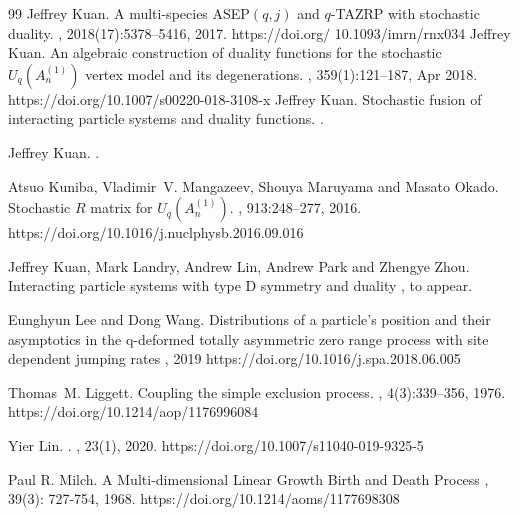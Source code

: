 \documentclass{ximera}
\begin{document}
\begin{thebibliography}{99}
Jeffrey Kuan.
\newblock A multi-species {ASEP}$(q,j)$ and $q$-{TAZRP} with stochastic
  duality.
,
  2018(17):5378--5416, 2017.
  https://doi.org/ 10.1093/imrn/rnx034
Jeffrey Kuan.
\newblock An algebraic construction of duality functions for the stochastic
  ${U}_q({A}_n^{(1)})$ vertex model and its degenerations.
, 359(1):121--187, Apr
  2018. https://doi.org/10.1007/s00220-018-3108-x
Jeffrey {Kuan}.
\newblock Stochastic fusion of interacting particle systems and duality
  functions.
.

Jeffrey {Kuan}.
.


Atsuo Kuniba, Vladimir~V. Mangazeev, Shouya Maruyama and Masato Okado.
\newblock Stochastic {$R$} matrix for ${U}_q({A}_n^{(1)})$.
, 913:248--277, 2016.
https://doi.org/10.1016/j.nuclphysb.2016.09.016

Jeffrey Kuan, Mark Landry, Andrew Lin, Andrew Park and Zhengye Zhou.
\newblock Interacting particle systems with type D symmetry and duality
, to appear.



Eunghyun Lee and Dong Wang.
\newblock  Distributions of a particle’s position and their asymptotics in the q-deformed totally asymmetric zero range process with site dependent jumping rates
,
  {2019}
https://doi.org/10.1016/j.spa.2018.06.005


Thomas~M. Liggett.
\newblock Coupling the simple exclusion process.
, 4(3):339--356, 1976.
https://doi.org/10.1214/aop/1176996084

Yier {Lin}.
.
, 23(1), 2020.
https://doi.org/10.1007/s11040-019-9325-5

Paul R. Milch.
\newblock A Multi-dimensional Linear Growth Birth and Death Process
, 39(3): 727-754, 1968. 
https://doi.org/10.1214/aoms/1177698308


\end{thebibliography}
\end{document}
